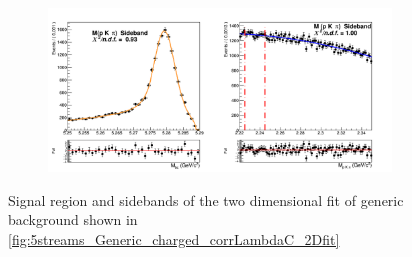 \begin{figure}[H]
  \begin{subfigure}{15cm}
    \centering\includegraphics[width=14cm]{A1-Appendix/figs/InvM_Sideband_stream12345_Generic_charged_corrLambdaC_2Dfit.png}
  \end{subfigure}
  \caption{Signal region and sidebands of the two dimensional fit of generic background shown in \cref{fig:5streams_Generic_charged_corrLambdaC_2Dfit}}
\end{figure}


\newpage


